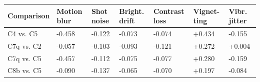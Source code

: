 \begin{tabular}{lllllll}
\toprule
Comparison & Motion blur & Shot noise & Bright. drift & Contrast loss & Vignet- ting & Vibr. jitter \\
\midrule
C4 vs. C5 & -0.458 & -0.122 & -0.073 & -0.074 & +0.434 & -0.155 \\
C7q vs. C2 & -0.057 & -0.103 & -0.093 & -0.121 & +0.272 & +0.004 \\
C7q vs. C5 & -0.457 & -0.112 & -0.075 & -0.077 & +0.280 & -0.159 \\
C8b vs. C5 & -0.090 & -0.137 & -0.065 & -0.070 & +0.197 & -0.084 \\
\bottomrule
\end{tabular}
